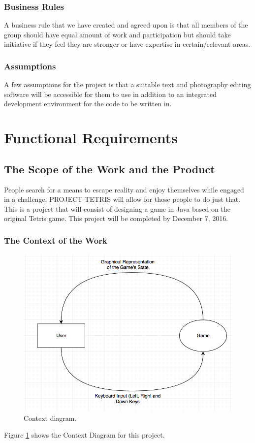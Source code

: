 \documentclass[12pt, titlepage]{article}
\begin{document}
\subsubsection{Business Rules}
A business rule that we have created and agreed upon is that all members of the group should have equal amount of work and participation but should take initiative if they feel they are stronger or have expertise in certain/relevant areas.

\subsubsection{Assumptions}
A few assumptions for the project is that a suitable text and photography editing software will be accessible for them to use in addition to an integrated development environment for the code to be written in. 

\section{Functional Requirements}

\subsection{The Scope of the Work and the Product}
People search for a means to escape reality and enjoy themselves while engaged in a challenge. PROJECT TETRIS will allow for those people to do just that. This is a project that will consist of designing a game in Java based on the original Tetris game. This project will be completed by December 7, 2016.
\subsubsection{The Context of the Work}
\begin{figure}
	\includegraphics[width=\linewidth]{fig1.png}
	\caption{Context diagram.}
	\label{fig:context}
\end{figure}
Figure \ref{fig:context} shows the Context Diagram for this project. 
\end{document}
